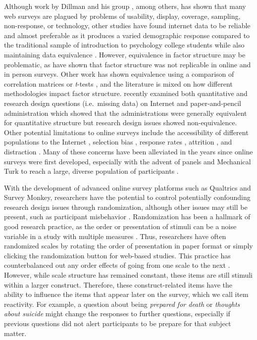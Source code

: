\documentclass[english,man, mask]{apa6}
\theoremstyle{definition}
\theoremstyle{definition}
\theoremstyle{definition}
\theoremstyle{remark}
\begin{document}
Although work by Dillman and his group
\autocites{Frick2001}{Smyth2006}{Dillman2008}, among others, has shown
that many web surveys are plagued by problems of usability, display,
coverage, sampling, non-response, or technology, other studies have
found internet data to be reliable and almost preferable as it produces
a varied demographic response compared to the traditional sample of
introduction to psychology college students while also maintaining data
equivalence \autocite{Lewis2009}. However, equivalence in factor
structure may be problematic, as \textcite{Buchanan2005} have shown that
factor structure was not replicable in online and in person surveys.
Other work has shown equivalence using a comparison of correlation
matrices \autocite{Meyerson2003} or \emph{t}-tests
\autocites{Schulenberg1999}{Schulenberg2001}, and the literature is
mixed on how different methodologies impact factor structure.
\textcite{Weigold2013} recently examined both quantitative and research
design questions (i.e.~missing data) on Internet and paper-and-pencil
administration which showed that the administrations were generally
equivalent for quantitative structure but research design issues showed
non-equivalence. Other potential limitations to online surveys include
the accessibility of different populations to the Internet
\autocite{Frick2001}, selection bias \autocite{Bethlehem2010}, response
rates \autocites{Cook2000}{Hox1994}{DeLeeuw1988}{Cantrell2007},
attrition \autocite{Cronk2002}, and distraction
\autocite{Tourangeau1999}. Many of these concerns have been alleviated
in the years since online surveys were first developed, especially with
the advent of panels and Mechanical Turk to reach a large, diverse
population of participants \autocite{Buhrmester2011}.

With the development of advanced online survey platforms such as
Qualtrics and Survey Monkey, researchers have the potential to control
potentially confounding research design issues through randomization,
although other issues may still be present, such as participant
misbehavior \autocite{Nosek2002}. Randomization has been a hallmark of
good research practice, as the order or presentation of stimuli can be a
noise variable in a study with multiple measures \autocite{Keppel2004}.
Thus, researchers have often randomized scales by rotating the order of
presentation in paper format or simply clicking the randomization button
for web-based studies. This practice has counterbalanced out any order
effects of going from one scale to the next \autocite{Keppel2004}.
However, while scale structure has remained constant, these items are
still stimuli within a larger construct. Therefore, these
construct-related items have the ability to influence the items that
appear later on the survey, which we call item reactivity. For example,
a question about being \emph{prepared for death} or \emph{thoughts about
suicide} might change the responses to further questions, especially if
previous questions did not alert participants to be prepare for that
subject matter.
\end{document}
